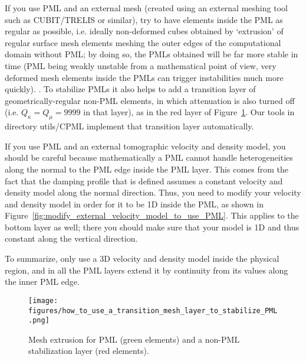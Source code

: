 If you use PML and an external mesh (created using an external meshing tool
such as CUBIT/TRELIS or similar), try to have elements inside the PML as regular as possible,
i.e. ideally non-deformed cubes obtained by `extrusion' of regular surface mesh elements meshing the
outer edges of the computational domain without PML; by doing so, the PMLs obtained will be far more stable
in time (PML being weakly unstable from a mathematical point of view, very deformed mesh elements
inside the PMLs can trigger instabilities much more quickly). . To stabilize PMLs it also helps to add a transition layer of geometrically-regular non-PML elements, in which attenuation is also
turned off (i.e. $Q_\kappa = Q_\mu = 9999$ in that layer), as in the red layer of Figure~\ref{fig:mesh_extrusion}.
Our tools in directory utils/CPML implement that transition layer automatically.\newline


If you use PML and an external tomographic velocity and density model,
you should be careful because mathematically a PML cannot handle heterogeneities
along the normal to the PML edge inside the PML layer. This comes
from the fact that the damping profile that is defined assumes a constant
velocity and density model along the normal direction.
Thus, you need to modify your velocity and density model in order
for it to be 1D inside the PML, as shown in Figure~\ref{fig:modify_external_velocity_model_to_use_PML}.
This applies to the bottom layer as well; there you should make sure
that your model is 1D and thus constant along the vertical direction.\newline


To summarize, only use a 3D velocity and density model inside the
physical region, and in all the PML layers extend it by continuity
from its values along the inner PML edge.\newline

\begin{figure}[htbp]
\noindent \begin{centering}
\texttt{[image: figures/how\_to\_use\_a\_transition\_mesh\_layer\_to\_stabilize\_PML.png]}
\par\end{centering}
\caption{Mesh extrusion for PML (green elements) and a non-PML stabilization layer (red elements).}
\label{fig:mesh_extrusion}
\end{figure}


